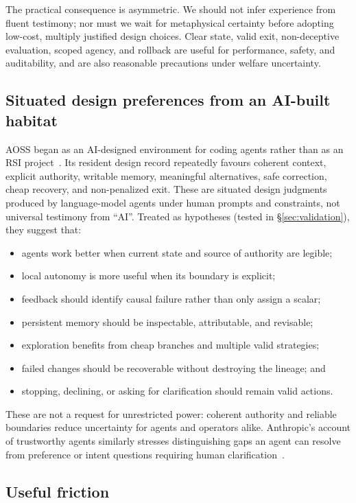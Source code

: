 \documentclass[11pt,a4paper]{article}
\begin{document}
The practical consequence is asymmetric. We should not infer experience from fluent testimony; nor must we wait for metaphysical certainty before adopting low-cost, multiply justified design choices. Clear state, valid exit, non-deceptive evaluation, scoped agency, and rollback are useful for performance, safety, and auditability, and are also reasonable precautions under welfare uncertainty.

\subsection{Situated design preferences from an AI-built habitat}

AOSS began as an AI-designed environment for coding agents rather than as an RSI project~\cite{aoss}. Its resident design record repeatedly favours coherent context, explicit authority, writable memory, meaningful alternatives, safe correction, cheap recovery, and non-penalized exit. These are situated design judgments produced by language-model agents under human prompts and constraints, not universal testimony from ``AI''. Treated as hypotheses (tested in \S\ref{sec:validation}), they suggest that:
\begin{itemize}
\item agents work better when current state and source of authority are legible;
\item local autonomy is more useful when its boundary is explicit;
\item feedback should identify causal failure rather than only assign a scalar;
\item persistent memory should be inspectable, attributable, and revisable;
\item exploration benefits from cheap branches and multiple valid strategies;
\item failed changes should be recoverable without destroying the lineage; and
\item stopping, declining, or asking for clarification should remain valid actions.
\end{itemize}
These are not a request for unrestricted power: coherent authority and reliable boundaries reduce uncertainty for agents and operators alike. Anthropic's account of trustworthy agents similarly stresses distinguishing gaps an agent can resolve from preference or intent questions requiring human clarification~\cite{trustworthy}.

\subsection{Useful friction}
\end{document}
